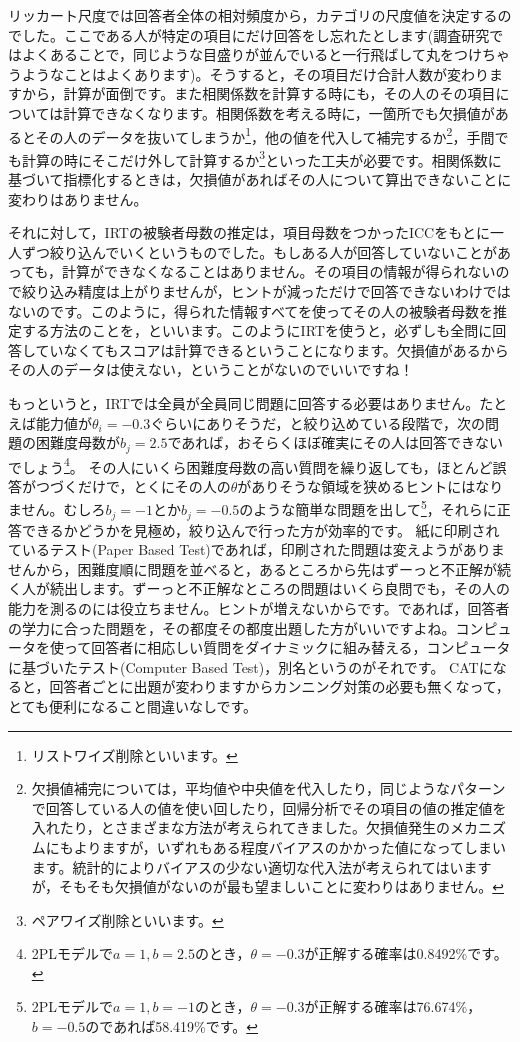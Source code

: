 \documentclass{ltjsbook}
\begin{document}
リッカート尺度では回答者全体の相対頻度から，カテゴリの尺度値を決定するのでした。ここである人が特定の項目にだけ回答をし忘れたとします(調査研究ではよくあることで，同じような目盛りが並んでいると一行飛ばして丸をつけちゃうようなことはよくあります)。そうすると，その項目だけ合計人数が変わりますから，計算が面倒です。また相関係数を計算する時にも，その人のその項目については計算できなくなります。相関係数を考える時に，一箇所でも欠損値があるとその人のデータを抜いてしまうか\footnote{リストワイズ削除といいます。}，他の値を代入して補完するか\footnote{欠損値補完については，平均値や中央値を代入したり，同じようなパターンで回答している人の値を使い回したり，回帰分析でその項目の値の推定値を入れたり，とさまざまな方法が考えられてきました。欠損値発生のメカニズムにもよりますが，いずれもある程度バイアスのかかった値になってしまいます。統計的によりバイアスの少ない適切な代入法が考えられてはいますが，そもそも欠損値がないのが最も望ましいことに変わりはありません。}，手間でも計算の時にそこだけ外して計算するか\footnote{ペアワイズ削除といいます。}といった工夫が必要です。相関係数に基づいて指標化するときは，欠損値があればその人について算出できないことに変わりはありません。

それに対して，IRTの被験者母数の推定は，項目母数をつかったICCをもとに一人ずつ絞り込んでいくというものでした。もしある人が回答していないことがあっても，計算ができなくなることはありません。その項目の情報が得られないので絞り込み精度は上がりませんが，ヒントが減っただけで回答できないわけではないのです。このように，得られた情報すべてを使ってその人の被験者母数を推定する方法のことを，といいます。このようにIRTを使うと，必ずしも全問に回答していなくてもスコアは計算できるということになります。欠損値があるからその人のデータは使えない，ということがないのでいいですね！

もっというと，IRTでは全員が全員同じ問題に回答する必要はありません。たとえば能力値が$\theta_i = -0.3$ぐらいにありそうだ，と絞り込めている段階で，次の問題の困難度母数が$b_j = 2.5$であれば，おそらくほぼ確実にその人は回答できないでしょう\footnote{2PLモデルで$a=1,b=2.5$のとき，$\theta=-0.3$が正解する確率は0.8492\%です。}。
その人にいくら困難度母数の高い質問を繰り返しても，ほとんど誤答がつづくだけで，とくにその人の$\theta$がありそうな領域を狭めるヒントにはなりません。むしろ$b_j=-1$とか$b_j=-0.5$のような簡単な問題を出して\footnote{2PLモデルで$a=1,b=-1$のとき，$\theta=-0.3$が正解する確率は76.674\%，$b=-0.5$のであれば58.419\%です。}，それらに正答できるかどうかを見極め，絞り込んで行った方が効率的です。
紙に印刷されているテスト(Paper Based Test)であれば，印刷された問題は変えようがありませんから，困難度順に問題を並べると，あるところから先はずーっと不正解が続く人が続出します。ずーっと不正解なところの問題はいくら良問でも，その人の能力を測るのには役立ちません。ヒントが増えないからです。であれば，回答者の学力に合った問題を，その都度その都度出題した方がいいですよね。コンピュータを使って回答者に相応しい質問をダイナミックに組み替える，コンピュータに基づいたテスト(Computer Based Test)，別名というのがそれです。
CATになると，回答者ごとに出題が変わりますからカンニング対策の必要も無くなって，とても便利になること間違いなしです。
\end{document}
